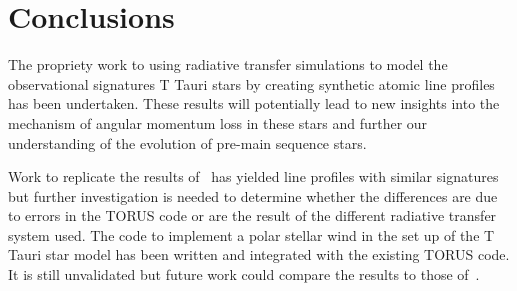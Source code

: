 \documentclass[fleqn,usenatbib]{mnras}
\begin{document}
\section{Conclusions}
\label{sec:conclusions}
The propriety work to using radiative transfer simulations to model the observational signatures T Tauri stars by creating synthetic atomic line profiles has been undertaken. These results will potentially lead to new insights into the mechanism of angular momentum loss in these stars and further our understanding of the evolution of pre-main sequence stars.

Work to replicate the results of~\citep{1998ApJ...492..743M} has yielded line profiles with similar signatures but further investigation is needed to determine whether the differences are due to errors in the TORUS code or are the result of the different radiative transfer system used.
The code to implement a polar stellar wind in the set up of the T Tauri star model has been written and integrated with the existing TORUS code. It is still unvalidated but future work could compare the results to those of~\citet{Kurosawa:2011fh}.




\clearpage







\bsp    %
\label{lastpage}
\end{document}
